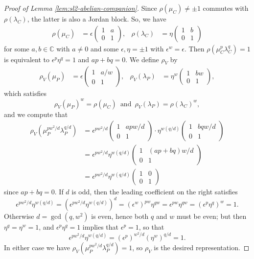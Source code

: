 \documentclass[10pt,a4paper]{amsart}
\newcommand{\C}{\mathbb{C}}
\begin{document}
\begin{proof}[Proof of Lemma \ref{lem:sl2-abelian-companion}]
Since $\rho(\mu_C) \neq \pm1$ commutes with $\rho(\lambda_C)$,  the latter is also a Jordan block. So, we have
\begin{align*}
\rho(\mu_C) &= \epsilon \begin{pmatrix} 1 & a \\ 0 & 1 \end{pmatrix}, &
\rho(\lambda_C) &= \eta \begin{pmatrix} 1 & b \\ 0 & 1 \end{pmatrix}
\end{align*}
for some $a,b\in\C$ with $a\neq 0$ and some $\epsilon,\eta=\pm1$ with $\epsilon^w = \epsilon$.  Then $\rho(\mu_C^p\lambda_C^q)=1$ is equivalent to $\epsilon^p\eta^q=1$ and $ap+bq=0$.  We define $\rho_V$ by
\begin{align*}
\rho_V(\mu_P) &= \epsilon \begin{pmatrix} 1 & a/w \\ 0 & 1 \end{pmatrix}, &
\rho_V(\lambda_P) &= \eta^w \begin{pmatrix} 1 & bw \\ 0 & 1 \end{pmatrix},
\end{align*}
which satisfies \[\rho_V(\mu_P)^w = \rho(\mu_C) \, \textrm{ and }\,\rho_V(\lambda_P) = \rho(\lambda_C)^w,\] and we compute that
\begin{align*}
\rho_V(\mu_P^{pw^2/d}\lambda_P^{q/d}) &= \epsilon^{pw^2/d} \begin{pmatrix} 1 & apw/d \\ 0 & 1 \end{pmatrix} \cdot \eta^{w(q/d)} \begin{pmatrix} 1 & bqw/d \\ 0 & 1 \end{pmatrix} \\
&= \epsilon^{pw^2/d}\eta^{w(q/d)} \begin{pmatrix} 1 & (ap+bq)w/d \\ 0 & 1 \end{pmatrix} \\
&= \epsilon^{pw^2/d}\eta^{w(q/d)} \begin{pmatrix} 1 & 0 \\ 0 & 1 \end{pmatrix}
\end{align*}
since $ap+bq=0$.  If $d$ is odd, then the leading coefficient on the right satisfies
\[ \epsilon^{pw^2/d}\eta^{w(q/d)} = \left(\epsilon^{pw^2/d}\eta^{w(q/d)}\right)^d = (\epsilon^w)^{pw} \eta^{qw} = \epsilon^{pw}\eta^{qw} = (\epsilon^p\eta^q)^w = 1. \]
Otherwise $d=\gcd(q,w^2)$ is even, hence both $q$ and $w$ must be even; but then $\eta^q = \eta^w=1$, and $\epsilon^p\eta^q=1$ implies that $\epsilon^p=1$, so that
\[ \epsilon^{pw^2/d}\eta^{w(q/d)} = (\epsilon^p)^{w^2/d} (\eta^w)^{q/d} = 1. \]
In either case we have $\rho_V(\mu_P^{pw^2/d}\lambda_P^{q/d}) = 1$, so $\rho_V$ is the desired representation.


\end{proof}
\end{document}
